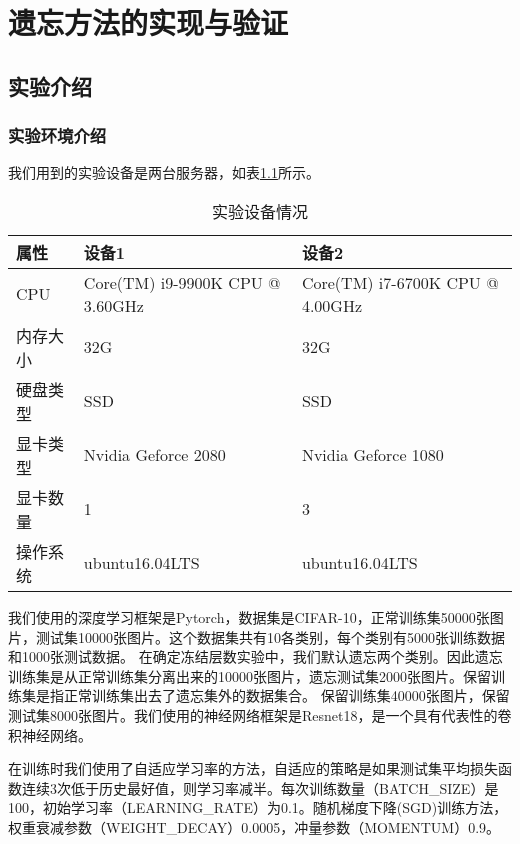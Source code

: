 
\chapter{遗忘方法的实现与验证}

\section{实验介绍}

\subsection{实验环境介绍}
我们用到的实验设备是两台服务器，如表\ref{tab:experiment-deivce}所示。
\begin{table}
    \centering
    \caption{实验设备情况}
    \begin{tabular}{lll}
      \toprule
      属性  & 设备1 & 设备2  \\
      \midrule
      CPU   & Core(TM) i9-9900K CPU @ 3.60GHz & Core(TM) i7-6700K CPU @ 4.00GHz \\
      内存大小  & 32G & 32G                    \\
      硬盘类型 & SSD  & SSD  \\
      显卡类型 & Nvidia Geforce 2080  & Nvidia Geforce 1080  \\
      显卡数量 & 1  & 3  \\
      操作系统 & ubuntu16.04LTS  & ubuntu16.04LTS  \\
      \bottomrule
    \end{tabular}
    \label{tab:experiment-deivce}
\end{table}

我们使用的深度学习框架是Pytorch，数据集是CIFAR-10\cite{cifar10_2009}，正常训练集50000张图片，测试集10000张图片。这个数据集共有10各类别，每个类别有5000张训练数据和1000张测试数据。
在确定冻结层数实验中，我们默认遗忘两个类别。因此遗忘训练集是从正常训练集分离出来的10000张图片，遗忘测试集2000张图片。保留训练集是指正常训练集出去了遗忘集外的数据集合。
保留训练集40000张图片，保留测试集8000张图片。我们使用的神经网络框架是Resnet18\cite{He_2016_CVPR}，是一个具有代表性的卷积神经网络。

在训练时我们使用了自适应学习率的方法，自适应的策略是如果测试集平均损失函数连续3次低于历史最好值，则学习率减半。每次训练数量（BATCH\_SIZE）是100，初始学习率（LEARNING\_RATE）为0.1。随机梯度下降(SGD)训练方法，权重衰减参数（WEIGHT\_DECAY）0.0005，冲量参数（MOMENTUM）0.9。

